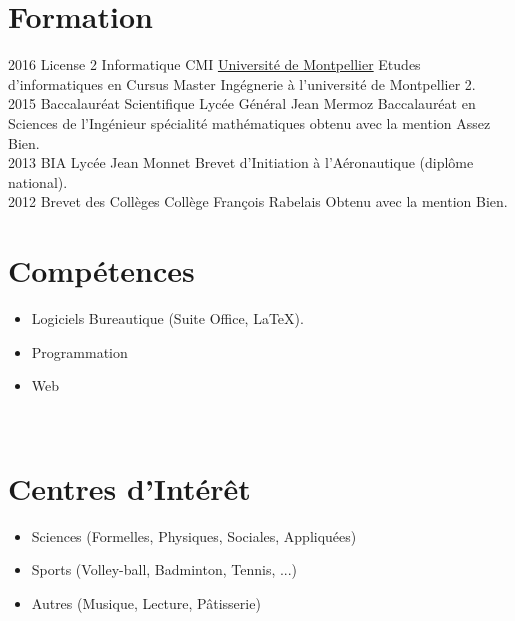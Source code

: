 \documentclass[]{friggeri-cv}
\begin{document}
\section{Formation}
\begin{entrylist}
  \entry
    {2016}
    {License 2 Informatique CMI}
    {\href{http://sciences.edu.umontpellier.fr/}{Université de Montpellier}}
    {Etudes d'informatiques en Cursus Master Ingégnerie à l'université de Montpellier 2.\\}
  \entry
    {2015}
    {Baccalauréat Scientifique}
    {Lycée Général Jean Mermoz}
    {Baccalauréat en Sciences de l'Ingénieur spécialité mathématiques obtenu avec la mention Assez Bien.\\}
  \entry
    {2013}
    {BIA}
    {Lycée Jean Monnet}
    {Brevet d'Initiation à l'Aéronautique (diplôme national).\\}
  \entry
    {2012}
    {Brevet des Collèges}
    {Collège François Rabelais}
    {Obtenu avec la mention Bien.\\}
\end{entrylist}

\section{Compétences}
\begin{itemize}
  \item Logiciels Bureautique (Suite Office, \LaTeX).
  \item Programmation
  \item Web
\end{itemize}
~
\section{Centres d'Intérêt}
\begin{itemize}
  \item Sciences (Formelles, Physiques, Sociales, Appliquées)
  \item Sports (Volley-ball, Badminton, Tennis, ...)
  \item Autres (Musique, Lecture, Pâtisserie)
\end{itemize}


% 
\end{document}
